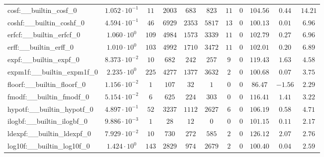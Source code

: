 \begin{tabular}{|l|c|c|c|c|c|c|c|c|c|c|}
cosf:\_\_builtin\_cosf\_0                 & $ 1.052 \cdot 10^{-1} $ & $ 11     $ & $ 2003   $ & $ 683   $ & $ 823   $ & $ 11  $ & $ 0 $ & $ 104.56      $ & $ 0.44    $ & $ 14.21   $ \\
coshf:\_\_builtin\_coshf\_0               & $ 4.594 \cdot 10^{-1} $ & $ 46     $ & $ 6929   $ & $ 2353  $ & $ 5817  $ & $ 13  $ & $ 0 $ & $ 100.13      $ & $ 0.01    $ & $ 6.96    $ \\
erfcf:\_\_builtin\_erfcf\_0               & $ 1.060 \cdot 10^{0}  $ & $ 109    $ & $ 4984   $ & $ 1573  $ & $ 3339  $ & $ 11  $ & $ 0 $ & $ 102.79      $ & $ 0.27    $ & $ 6.96    $ \\
erff:\_\_builtin\_erff\_0                 & $ 1.010 \cdot 10^{0}  $ & $ 103    $ & $ 4992   $ & $ 1710  $ & $ 3472  $ & $ 11  $ & $ 0 $ & $ 102.01      $ & $ 0.20    $ & $ 6.89    $ \\
expf:\_\_builtin\_expf\_0                 & $ 8.373 \cdot 10^{-2} $ & $ 10     $ & $ 682    $ & $ 242   $ & $ 257   $ & $ 9   $ & $ 0 $ & $ 119.43      $ & $ 1.63    $ & $ 4.58    $ \\
expm1f:\_\_builtin\_expm1f\_0             & $ 2.235 \cdot 10^{0}  $ & $ 225    $ & $ 4277   $ & $ 1377  $ & $ 3632  $ & $ 2   $ & $ 0 $ & $ 100.68      $ & $ 0.07    $ & $ 3.75    $ \\
floorf:\_\_builtin\_floorf\_0             & $ 1.156 \cdot 10^{-2} $ & $ 1      $ & $ 107    $ & $ 32    $ & $ 1     $ & $ 0   $ & $ 0 $ & $ 86.47       $ & $ -1.56   $ & $ 2.29    $ \\
fmodf:\_\_builtin\_fmodf\_0               & $ 5.154 \cdot 10^{-2} $ & $ 6      $ & $ 625    $ & $ 224   $ & $ 303   $ & $ 0   $ & $ 0 $ & $ 116.41      $ & $ 1.41    $ & $ 3.22    $ \\
hypotf:\_\_builtin\_hypotf\_0             & $ 4.897 \cdot 10^{-1} $ & $ 52     $ & $ 3237   $ & $ 1112  $ & $ 2627  $ & $ 6   $ & $ 0 $ & $ 106.19      $ & $ 0.58    $ & $ 4.71    $ \\
ilogbf:\_\_builtin\_ilogbf\_0             & $ 9.886 \cdot 10^{-3} $ & $ 1      $ & $ 28     $ & $ 12    $ & $ 0     $ & $ 0   $ & $ 0 $ & $ 101.15      $ & $ 0.11    $ & $ 2.17    $ \\
ldexpf:\_\_builtin\_ldexpf\_0             & $ 7.929 \cdot 10^{-2} $ & $ 10     $ & $ 730    $ & $ 272   $ & $ 585   $ & $ 2   $ & $ 0 $ & $ 126.12      $ & $ 2.07    $ & $ 2.76    $ \\
log10f:\_\_builtin\_log10f\_0             & $ 1.424 \cdot 10^{0}  $ & $ 143    $ & $ 2829   $ & $ 974   $ & $ 2679  $ & $ 2   $ & $ 0 $ & $ 100.40      $ & $ 0.04    $ & $ 2.59    $ \\

\end{tabular}
